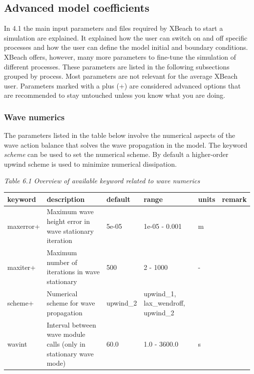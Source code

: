 \documentclass{article}
\begin{document}
\noindent \eject \textbf{}


\subsection{ Advanced model coefficients}

\noindent In 4.1 the main input parameters and files required by XBeach to start a simulation are explained. It explained how the user can switch on and off specific processes and how the user can define the model initial and boundary conditions. XBeach offers, however, many more parameters to fine-tune the simulation of different processes. These parameters are listed in the following subsections grouped by process. Most parameters are not relevant for the average XBeach user. Parameters marked with a plus (+) are considered advanced options that are recommended to stay untouched unless you know what you are doing.


\subsubsection{ Wave numerics}

\noindent The parameters listed in the table below involve the numerical aspects of the wave action balance that solves the wave propagation in the model. The keyword \textit{scheme }can be used to set the numerical scheme. By default a higher-order upwind scheme is used to minimize numerical dissipation.

\noindent \textit{Table 6.1 Overview of available keyword related to wave numerics}

\begin{tabular}{|p{0.7in}|p{1.0in}|p{0.6in}|p{0.9in}|p{0.4in}|p{0.6in}|} \hline 
keyword & description & default & range & units & remark \\ \hline 
maxerror+ & Maximum wave height error in wave stationary iteration & 5e-05 & 1e-05 - 0.001 & m &  \\ \hline 
maxiter+ & Maximum number of iterations in wave stationary & 500 & 2 - 1000 & - &  \\ \hline 
scheme+ & Numerical scheme for wave propagation & upwind\_2 & upwind\_1, lax\_wendroff, upwind\_2 &  &  \\ \hline 
wavint & Interval between wave module calls (only in stationary wave mode) & 60.0 & 1.0 - 3600.0 & s &  \\ \hline 
\end{tabular}
\end{document}
